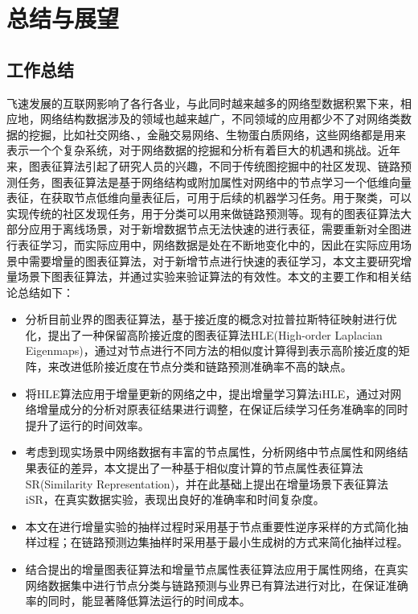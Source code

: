 \chapter{总结与展望}

\section{工作总结}
飞速发展的互联网影响了各行各业，与此同时越来越多的网络型数据积累下来，相应地，网络结构数据涉及的领域也越来越广，不同领域的应用都少不了对网络类数据的挖掘，比如社交网络、，金融交易网络、生物蛋白质网络，这些网络都是用来表示一个个复杂系统，对于网络数据的挖掘和分析有着巨大的机遇和挑战。近年来，图表征算法引起了研究人员的兴趣，不同于传统图挖掘中的社区发现、链路预测任务，图表征算法是基于网络结构或附加属性对网络中的节点学习一个低维向量表征，在获取节点低维向量表征后，可用于后续的机器学习任务。用于聚类，可以实现传统的社区发现任务，用于分类可以用来做链路预测等。现有的图表征算法大部分应用于离线场景，对于新增数据节点无法快速的进行表征，需要重新对全图进行表征学习，而实际应用中，网络数据是处在不断地变化中的，因此在实际应用场景中需要增量的图表征算法，对于新增节点进行快速的表征学习，本文主要研究增量场景下图表征算法，并通过实验来验证算法的有效性。本文的主要工作和相关结论总结如下：
\begin{itemize}
	\item 分析目前业界的图表征算法，基于接近度的概念对拉普拉斯特征映射进行优化，提出了一种保留高阶接近度的图表征算法HLE(High-order Laplacian Eigenmaps)，通过对节点进行不同方法的相似度计算得到表示高阶接近度的矩阵，来改进低阶接近度在节点分类和链路预测准确率不高的缺点。
	\item 将HLE算法应用于增量更新的网络之中，提出增量学习算法iHLE，通过对网络增量成分的分析对原表征结果进行调整，在保证后续学习任务准确率的同时提升了运行的时间效率。
	\item 考虑到现实场景中网络数据有丰富的节点属性，分析网络中节点属性和网络结果表征的差异，本文提出了一种基于相似度计算的节点属性表征算法SR(Similarity Representation)，并在此基础上提出在增量场景下表征算法iSR，在真实数据实验，表现出良好的准确率和时间复杂度。		
	\item 本文在进行增量实验的抽样过程时采用基于节点重要性逆序采样的方式简化抽样过程；在链路预测边集抽样时采用基于最小生成树的方式来简化抽样过程。
	\item 结合提出的增量图表征算法和增量节点属性表征算法应用于属性网络，在真实网络数据集中进行节点分类与链路预测与业界已有算法进行对比，在保证准确率的同时，能显著降低算法运行的时间成本。

\end{itemize}
